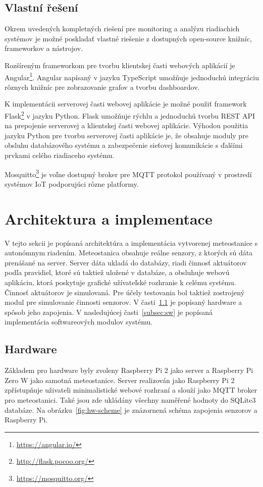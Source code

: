 \documentclass[11pt,a4paper]{article}
\begin{document}
\subsection{Vlastní řešení}
Okrem uvedených kompletných riešení pre monitoring a analýzu riadiachich systémov je možné poskladať vlastné riešenie
z dostupných open-source knižníc, frameworkov a nástrojov.

Rozšíreným frameworkom pre tvorbu klientskej časti webových aplikácií je Angular\footnote{\url{https://angular.io/}}.
Angular napísaný v jazyku TypeScript umožňuje jednoduchú integráciu rôznych knižníc pre zobrazovanie grafov a tvorbu dashboardov.

K implementácii serverovej časti webovej aplikácie je možné použiť framework Flask\footnote{\url{http://flask.pocoo.org/}} v jazyku Python.
Flask umožňuje rýchlu a jednoduchú tvorbu REST API na prepojenie serverovej a klientskej časti webovej aplikácie.
Výhodou použitia jazyku Python pre tvorbu serverovej časti aplikácie je, že obsahuje moduly pre obsluhu databázového systému
a zabezpečenie sieťovej komunikácie s ďalšími prvkami celého riadiaceho systému.

Mosquitto\footnote{\url{https://mosquitto.org/}} je voľne dostupný broker pre MQTT protokol používaný v prostredí systémov IoT podporujúci rôzne platformy.

\section{Architektura a implementace}
V tejto sekcii je popísaná architektúra a implementácia vytvorenej meteostanice s autonómnym riadením.
Meteostanica obsahuje reálne senzory, z ktorých sú dáta prenášané na server.
Server dáta ukladá do databázy, riadi činnosť aktuátorov podľa pravidiel, ktoré sú taktiež uložené v databáze,
a obsluhuje webovú aplikáciu, ktorá poskytuje grafické užívateľské rozhranie k celému systému.
Činnosť aktuátorov je simulovaná.
Pre účely testovania bol taktiež zostrojený modul pre simulovanie činnosti senzorov.
V časti~\ref{subsec:hw} je popísaný hardware a spôsob jeho zapojenia.
V nasledujúcej časti~\ref{subsec:sw} je popísaná implementácia softwareových modulov systému.

\subsection{Hardware}\label{subsec:hw}
Základem pro hardware byly zvoleny Raspberry Pi 2 jako server a Raspberry Pi Zero W jako samotná meteostanice. Server realizován jako Raspberry Pi 2 zpřístupňuje uživateli minimalistické webové rozhraní a slouží jako MQTT broker pro meteostanici. Také jsou zde ukládány všechny naměřené hodnoty do SQLite3 databáze.
Na obrázku~\ref{fig:hw-scheme} je znázornená schéma zapojenia senzorov a Raspberry Pi.
\end{document}

